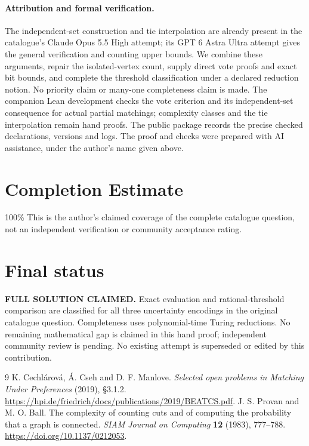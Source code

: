 \documentclass[11pt]{article}
\begin{document}
\paragraph{Attribution and formal verification.}
The independent-set construction and tie interpolation are already present in the catalogue's Claude Opus 5.5 High attempt; its GPT 6 Astra Ultra attempt gives the general verification and counting upper bounds. We combine these arguments, repair the isolated-vertex count, supply direct vote proofs and exact bit bounds, and complete the threshold classification under a declared reduction notion. No priority claim or many-one completeness claim is made. The companion Lean development checks the vote criterion and its independent-set consequence for actual partial matchings; complexity classes and the tie interpolation remain hand proofs. The public package records the precise checked declarations, versions and logs. The proof and checks were prepared with AI assistance, under the author's name given above.

\section*{Completion Estimate}
100\%
This is the author's claimed coverage of the complete catalogue question,
not an independent verification or community acceptance rating.

\section*{Final status}
\textbf{FULL SOLUTION CLAIMED.} Exact evaluation and rational-threshold
comparison are classified for all three uncertainty encodings in the
original catalogue question. Completeness uses polynomial-time Turing
reductions. No remaining mathematical gap is claimed in this hand proof;
independent community review is pending. No existing attempt is superseded
or edited by this contribution.

\begin{thebibliography}{9}
 K. Cechl\'arov\'a, \'A. Cseh and D. F. Manlove.
\emph{Selected open problems in Matching Under Preferences} (2019), \S3.1.2.
\url{https://hpi.de/friedrich/docs/publications/2019/BEATCS.pdf}.
 J. S. Provan and M. O. Ball.
The complexity of counting cuts and of computing the probability that a graph is connected.
\emph{SIAM Journal on Computing} \textbf{12} (1983), 777--788.
\url{https://doi.org/10.1137/0212053}.
\end{thebibliography}
\end{document}

